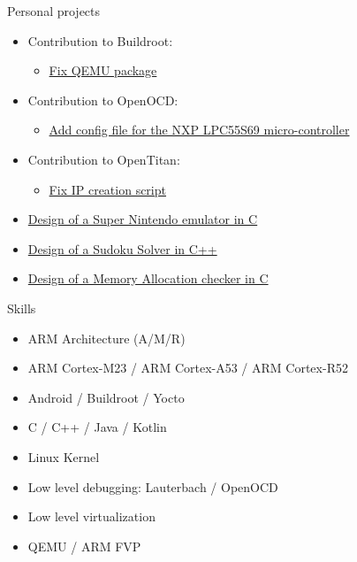 \documentclass[a4paper, 10pt]{article}
\begin{document}
\begin{unbreakableSection} {Personal projects}
\begin{projects}
\begin{itemize}[parsep=0cm,itemsep=0cm,topsep=0cm]
\begin{itemize}[parsep=0cm,itemsep=0cm,topsep=0cm]
			\end{itemize}
		\item Contribution to Buildroot:
			\begin{itemize}[parsep=0cm,itemsep=0cm,topsep=0cm]
				\item \href{https://git.busybox.net/buildroot/commit/?id=c2cdde4887500ca809ab52ff75d22afdb3c1168d}{Fix QEMU package}
			\end{itemize}
		\item Contribution to OpenOCD:
			\begin{itemize}[parsep=0cm,itemsep=0cm,topsep=0cm]
				\item \href{https://review.openocd.org/c/openocd/+/6787}{Add config file for the NXP LPC55S69 micro-controller}
			\end{itemize}
		\item Contribution to OpenTitan:
			\begin{itemize}[parsep=0cm,itemsep=0cm,topsep=0cm]
				\item \href{https://github.com/lowRISC/opentitan/pull/9251}{Fix IP creation script}
			\end{itemize}
	    \item \href{https://github.com/grassead/snesemu}{Design of a Super Nintendo emulator in C}
	    \item \href{https://github.com/grassead/sudokusolver}{Design of a Sudoku Solver in C++}
	    \item \href{https://github.com/grassead/memorychecker}{Design of a Memory Allocation checker in C}
	\end{itemize}
    \end{projects}
\end{unbreakableSection}

\begin{section} {Skills}
    \begin{skills}
	\begin{itemize}[parsep=0cm,itemsep=0cm,topsep=0cm]
	    \item ARM Architecture (A/M/R)
	    \item ARM Cortex-M23 / ARM Cortex-A53 / ARM Cortex-R52
	    \item Android / Buildroot / Yocto
	    \item C / C++ / Java / Kotlin
	    \item Linux Kernel
	    \item Low level debugging: Lauterbach / OpenOCD
	    \item Low level virtualization
	    \item QEMU / ARM FVP
	\end{itemize}
    \end{skills}
\end{section}
\end{document}
